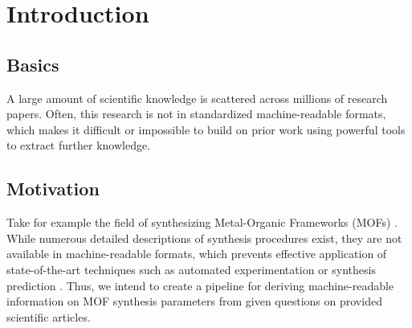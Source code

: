 \chapter{Introduction}
\section{Basics}
A large amount of scientific knowledge is scattered across millions of research
papers. Often, this research is not in standardized machine-readable formats,
which makes it difficult or impossible to build on prior work using powerful
tools to extract further knowledge.  

\section{Motivation}
Take for example the field of synthesizing Metal-Organic Frameworks (MOFs)
\cite{zhou_introduction_2012}. While numerous detailed descriptions of
synthesis procedures exist, they are not available in machine-readable formats,
which prevents effective application of state-of-the-art techniques such as
automated experimentation \cite{shi_automated_2021} or synthesis prediction
\cite{luo_mof_2022}. Thus, we intend to create a pipeline for deriving
machine-readable information on MOF synthesis parameters from given questions
on provided scientific articles.

